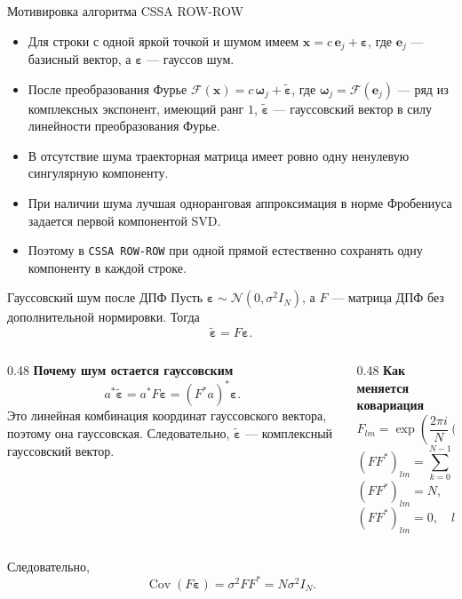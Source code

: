 \documentclass[unicode,notheorems]{beamer}
\begin{document}
\begin{frame}{Мотивировка алгоритма CSSA ROW-ROW}
	\small
	\begin{itemize}
		\item Для строки с одной яркой точкой и шумом имеем
		$\mathbf{x} = c\,\mathbf{e}_j + \boldsymbol{\varepsilon}$,
		где $\mathbf{e}_j$ --- базисный вектор, а $\boldsymbol{\varepsilon}$ --- гауссов шум.
		\item После преобразования Фурье
		$\mathcal{F}(\mathbf{x}) = c\,\boldsymbol{\omega}_j + \widetilde{\boldsymbol{\varepsilon}}$,
		где $\boldsymbol{\omega}_j=\mathcal{F}(\mathbf{e}_j)$ --- ряд из комплексных экспонент, имеющий ранг $1$, $\widetilde{\boldsymbol{\varepsilon}}$ --- гауссовский вектор в силу линейности преобразования Фурье.
		\item В отсутствие шума траекторная матрица имеет ровно одну ненулевую сингулярную компоненту.
		\item При наличии шума лучшая одноранговая аппроксимация в норме Фробениуса задается первой компонентой SVD.
		\item Поэтому в \texttt{CSSA ROW-ROW} при одной прямой естественно сохранять одну компоненту в каждой строке.
	\end{itemize}
\end{frame}

\begin{frame}{Гауссовский шум после ДПФ}
	\scriptsize
	Пусть $\boldsymbol{\varepsilon}\sim \mathcal N(0,\sigma^2 I_N)$, а $F$ --- матрица ДПФ без дополнительной нормировки. Тогда
	\[
		\widetilde{\boldsymbol{\varepsilon}} = F\boldsymbol{\varepsilon}.
	\]

	\vspace{-0.2cm}
	\begin{columns}[T]
		\begin{column}{0.48\textwidth}
			\textbf{Почему шум остается гауссовским}
			\[
				a^{*}\widetilde{\boldsymbol{\varepsilon}}
				= a^{*}F\boldsymbol{\varepsilon}
				= (F^{*}a)^{*}\boldsymbol{\varepsilon}.
			\]
			Это линейная комбинация координат гауссовского вектора, поэтому она гауссовская. Следовательно, $\widetilde{\boldsymbol{\varepsilon}}$ --- комплексный гауссовский вектор.
		\end{column}
		\begin{column}{0.48\textwidth}
			\textbf{Как меняется ковариация}
			\[
				F_{lm}=\exp\!\left(\frac{2\pi i}{N}(l-1)(m-1)\right),
			\]
			\[
				(FF^{*})_{lm}=
				\sum_{k=0}^{N-1}
				\exp\!\left(\frac{2\pi i}{N}k(l-m)\right).
			\]
			\[
				(FF^{*})_{lm}=N,\quad l=m,
			\]
			\vspace{-0.35cm}
			\[
				(FF^{*})_{lm}=0,\quad l\ne m.
			\]
		\end{column}
	\end{columns}

	\vspace{0.05cm}
	Следовательно,
	\[
		\operatorname{Cov}(F\boldsymbol{\varepsilon})=\sigma^2 FF^{*}=N\sigma^2 I_N.
	\]
\end{frame}
\end{document}
